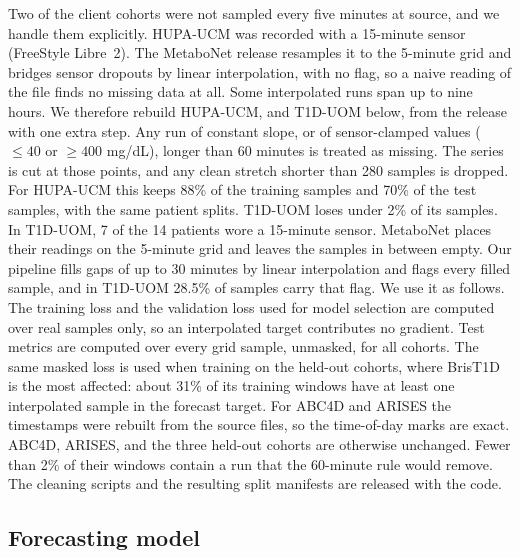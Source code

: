 \documentclass[10pt,letterpaper]{article}
\begin{document}
Two of the client cohorts were not sampled every five minutes at source, and
we handle them explicitly. HUPA-UCM was recorded with a 15-minute sensor
(FreeStyle Libre~2). The MetaboNet release resamples it to the 5-minute grid
and bridges sensor dropouts by linear interpolation, with no flag, so a naive
reading of the file finds no missing data at all. Some interpolated runs span
up to nine hours. We therefore rebuild HUPA-UCM, and T1D-UOM below, from the
release with one extra step. Any run of constant slope, or of sensor-clamped
values ($\le 40$ or $\ge 400$ mg/dL), longer than 60 minutes is treated as
missing. The series is cut at those points, and any clean stretch shorter
than 280 samples is dropped. For HUPA-UCM this keeps 88\% of the training
samples and 70\% of the test samples, with the same patient splits. T1D-UOM
loses under 2\% of its samples. In T1D-UOM, 7 of the 14 patients wore a
15-minute sensor. MetaboNet places their readings on the 5-minute grid and
leaves the samples in between empty. Our pipeline fills gaps of up to 30
minutes by linear interpolation and flags every filled sample, and in T1D-UOM
28.5\% of samples carry that flag. We use it as follows. The training loss
and the validation loss used for model selection are computed over real
samples only, so an interpolated target contributes no gradient. Test metrics
are computed over every grid sample, unmasked, for all cohorts. The same
masked loss is used when training on the held-out cohorts, where BrisT1D is
the most affected: about 31\% of its training windows have at least one
interpolated sample in the forecast target. For ABC4D and ARISES the
timestamps were rebuilt from the source files, so the time-of-day marks are
exact. ABC4D, ARISES, and the three held-out cohorts are otherwise unchanged.
Fewer than 2\% of their windows contain a run that the 60-minute rule would
remove. The cleaning scripts and the resulting split manifests are released
with the code.

\subsection*{Forecasting model}
\end{document}
